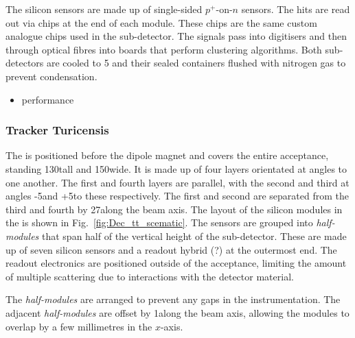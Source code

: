 The silicon sensors are made up of single-sided $p^{+}$-on-$n$ sensors. The hits are read out via chips at the end of each module. These chips are the same custom analogue chips used in the \velo sub-detector. The signals pass into digitisers and then through optical fibres into \tellone boards that perform clustering algorithms.
Both sub-detectors are cooled to 5 and their sealed containers flushed with nitrogen gas to prevent condensation.


{\color{Red}
\begin{itemize}
\item performance
\end{itemize}
}


\subsubsection{Tracker Turicensis}

The \ttracker is positioned before the dipole magnet and covers the entire \lhcb acceptance, standing 130\cm tall and 150\cm wide.
It is made up of four layers orientated at angles to one another. The first and fourth layers are parallel, with the second and third at angles -5\degrees and +5\degrees to these respectively. The first and second are separated from the third and fourth by 27\cm along the beam axis. The layout of the silicon modules in the \ttracker is shown in Fig.~\ref{fig:Dec_tt_scematic}. The sensors are grouped into \emph{half-modules} that span half of the vertical height of the sub-detector. These are made up of seven silicon sensors and a readout hybrid (?) at the outermost end. The readout electronics are positioned outside of the \lhcb acceptance, limiting the amount of multiple scattering due to interactions with the detector material. 

The \emph{half-modules} are arranged to prevent any gaps in the instrumentation. The adjacent \emph{half-modules} are offset by 1\cm along the beam axis, allowing the modules to overlap by a few millimetres in the $x$-axis. 


